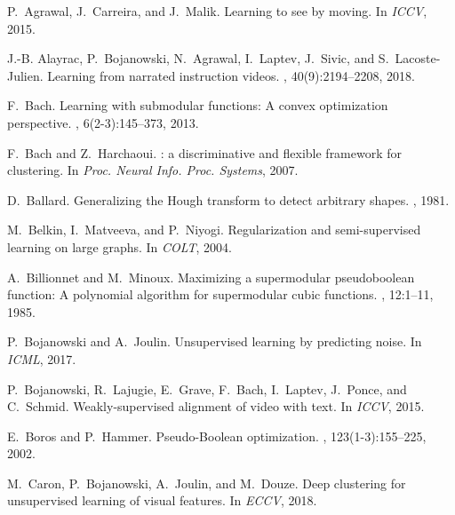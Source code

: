 \documentclass[10pt,twocolumn,letterpaper]{article}
\numberwithin{theorem}{section}
\begin{document}
\clearpage
\ifx\URL\undefined {}
  \def\URL{\catcode`\~=12 \catcode`\_=12 \URLset} \fi
\begin{thebibliography}{10}\itemsep=-1pt

P.~Agrawal, J.~Carreira, and J.~Malik.
\newblock Learning to see by moving.
\newblock In {\em ICCV}, 2015.

J.-B. Alayrac, P.~Bojanowski, N.~Agrawal, I.~Laptev, J.~Sivic, and
  S.~Lacoste-Julien.
\newblock Learning from narrated instruction videos.
,
  40(9):2194--2208, 2018.

F.~Bach.
\newblock Learning with submodular functions: A convex optimization
  perspective.
, 6(2-3):145--373,
  2013.

F.~Bach and Z.~Harchaoui.
 : a discriminative and flexible framework for clustering.
\newblock In {\em Proc. Neural Info. Proc. Systems}, 2007.

D.~Ballard.
\newblock Generalizing the {H}ough transform to detect arbitrary shapes.
, 1981.

M.~Belkin, I.~Matveeva, and P.~Niyogi.
\newblock Regularization and semi-supervised learning on large graphs.
\newblock In {\em COLT}, 2004.

A.~Billionnet and M.~Minoux.
\newblock Maximizing a supermodular pseudoboolean function: A polynomial
  algorithm for supermodular cubic functions.
, 12:1--11, 1985.

P.~Bojanowski and A.~Joulin.
\newblock Unsupervised learning by predicting noise.
\newblock In {\em ICML}, 2017.

P.~Bojanowski, R.~Lajugie, E.~Grave, F.~Bach, I.~Laptev, J.~Ponce, and
  C.~Schmid.
\newblock Weakly-supervised alignment of video with text.
\newblock In {\em ICCV}, 2015.

E.~Boros and P.~Hammer.
\newblock Pseudo-{B}oolean optimization.
, 123(1-3):155--225, 2002.

M.~Caron, P.~Bojanowski, A.~Joulin, and M.~Douze.
\newblock Deep clustering for unsupervised learning of visual features.
\newblock In {\em ECCV}, 2018.


\end{thebibliography}
\end{document}
